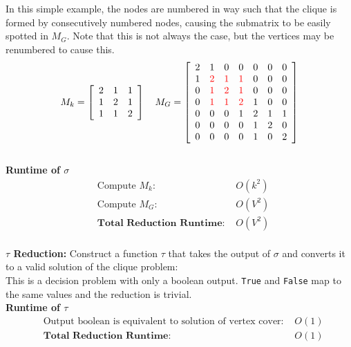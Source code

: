\documentclass[11pt]{article}
\begin{document}
In this simple example, the nodes are numbered in way such that the clique is formed by consecutively numbered nodes, causing the submatrix to be easily spotted in $M_G$. Note that this is not always the case, but the vertices may be renumbered to cause this.\\
 
\[M_k = 
\left[ {\begin{array}{*{3}c}
   2 & 1 & 1  \\
   1 & 2 & 1 \\
   1 & 1 & 2  \\
 \end{array} } \right]
\quad
 M_G = 
\left[ {\begin{array}{*{7}c}
   2 & 1 & 0 & 0 & 0 & 0 & 0  \\
   1 & \textcolor{red} 2 & \textcolor{red}1 & \textcolor{red}1 & 0 & 0 & 0  \\
   0 & \textcolor{red}1 & \textcolor{red}2 & \textcolor{red}1 & 0 & 0 & 0  \\
   0 & \textcolor{red}1 & \textcolor{red}1 & \textcolor{red}2 & 1 & 0 & 0  \\
   0 & 0 & 0 & 1 & 2 & 1 & 1  \\
   0 & 0 & 0 & 0 & 1 & 2 & 0  \\
   0 & 0 & 0 & 0 & 1 & 0 & 2  \\
 \end{array} } \right]
\]\\


\textbf{Runtime of $\sigma$}
\begin{align*}
&\text{Compute $M_k$: } &O(k^2)\\ 
&\text{Compute $M_G$: } &O(V^2)\\ 
&\textbf{Total Reduction Runtime: } &O(V^2)\\
\end{align*}


\textbf{$\tau$ Reduction:}
Construct a function $\tau$ that takes the output of $\sigma$ and converts it to a valid solution of the clique problem:\\

This is a decision problem with only a boolean output. \texttt{True} and \texttt{False} map to the same values and the reduction is trivial.\\

\textbf{Runtime of $\tau$ }
\begin{align*}
&\text{Output boolean is equivalent to solution of vertex cover: } &O(1)\\ 
&\textbf{Total Reduction Runtime: } &O(1)\\
\end{align*}
\end{document}
